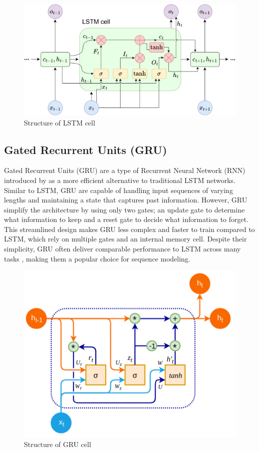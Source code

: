 \documentclass[]{interact}
\theoremstyle{plain}%
\theoremstyle{definition}
\theoremstyle{remark}
\begin{document}
\begin{figure}

{\centering \includegraphics[width=0.75\linewidth]{lstm} 

}

\caption{Structure of LSTM cell}\label{fig:figlstm}
\end{figure}

\subsection{Gated Recurrent Units
(GRU)}\label{gated-recurrent-units-gru}

Gated Recurrent Units (GRU) are a type of Recurrent Neural Network (RNN)
introduced by \citep{chung2014} as a more efficient alternative to
traditional LSTM networks. Similar to LSTM, GRU are capable of handling
input sequences of varying lengths and maintaining a state that captures
past information. However, GRU simplify the architecture by using only
two gates; an update gate to determine what information to keep and a
reset gate to decide what information to forget. This streamlined design
makes GRU less complex and faster to train compared to LSTM, which rely
on multiple gates and an internal memory cell. Despite their simplicity,
GRU often deliver comparable performance to LSTM across many tasks
\citep{yang2020}, making them a popular choice for sequence modeling.

\begin{figure}

{\centering \includegraphics[width=0.75\linewidth]{GRU} 

}

\caption{Structure of GRU cell}\label{fig:figgru}
\end{figure}
\end{document}
